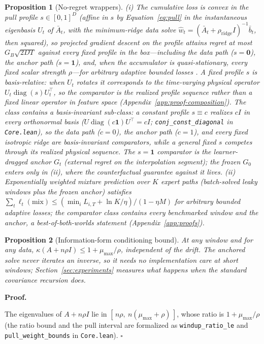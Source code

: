 \documentclass[10pt]{article}
\newtheorem{proposition}{Proposition}
\newenvironment{proof}[1][Proof]{%
  \par\noindent\textbf{#1.}\hspace{0.4em}\ignorespaces
}{%
  \hfill\ensuremath{\square}\par\medskip
}
\begin{document}
\begin{proposition}[No-regret wrappers]
\label{prop:ocowrap}
(i) The cumulative loss is convex in the pull profile $s \in [0,1]^D$ (affine in $s$ by Equation~\eqref{eq:pull} in the instantaneous eigenbasis $U_t$ of $\bar A_t$, with the minimum-ridge data solve $\widehat w_t = (\bar A_t + \rho_{\mathrm{ridge}}I)^{-1}\bar b_t$, then squared), so projected gradient descent on the profile attains regret at most $G_B\sqrt{2DT}$ against every fixed profile in the box---including the data path ($s = \mathbf 0$), the anchor path ($s = \mathbf 1$), and, when the accumulator is quasi-stationary, every fixed scalar strength $\rho$---for arbitrary adaptive bounded losses \citep{zinkevich2003}.
A fixed profile $s$ is basis-relative: when $U_t$ rotates it corresponds to the time-varying physical operator $U_t\operatorname{diag}(s)U_t^\top$, so the comparator is the realized profile sequence rather than a fixed linear operator in feature space (Appendix~\ref{app:proof-composition}). The class contains a basis-invariant sub-class: a constant profile $s \equiv c$ realizes $cI$ in every orthonormal basis ($U\operatorname{diag}(c\mathbf 1)U^\top = cI$; \texttt{conj\_const\_diagonal} in \texttt{Core.lean}), so the data path ($c=0$), the anchor path ($c=1$), and every fixed isotropic ridge are basis-invariant comparators, while a general fixed $s$ competes through its realized physical sequence.
The $s = \mathbf 1$ comparator is the learner-dragged anchor $G_t$ (external regret on the interpolation segment); the frozen $G_0$ enters only in (ii), where the counterfactual guarantee against it lives.
(ii) Exponentially weighted mixture prediction over $K$ expert paths (batch-solved leaky windows plus the frozen anchor) satisfies $\sum_t \ell_t(\mathrm{mix}) \le (\min_i L_{i,T} + \ln K/\eta)/(1 - \eta M)$ for arbitrary bounded adaptive losses; the comparator class contains every benchmarked window and the anchor, a best-of-both-worlds statement (Appendix~\ref{app:proofs}).
\end{proposition}

\begin{proposition}[Information-form conditioning bound]
\label{prop:windup}
At any window and for any data, $\kappa(A + n\rho I) \le 1 + \mu_{\max}/\rho$, independent of the drift.
The anchored solve never iterates an inverse, so it needs no implementation care at short windows; Section~\ref{sec:experiments} measures what happens when the standard covariance recursion does.
\end{proposition}
\begin{proof}
The eigenvalues of $A + n\rho I$ lie in $[\,n\rho,\ n(\mu_{\max} + \rho)\,]$, whose ratio is $1 + \mu_{\max}/\rho$ (the ratio bound and the pull interval are formalized as \texttt{windup\_ratio\_le} and \texttt{pull\_weight\_bounds} in \texttt{Core.lean}).
\end{proof}
\end{document}
